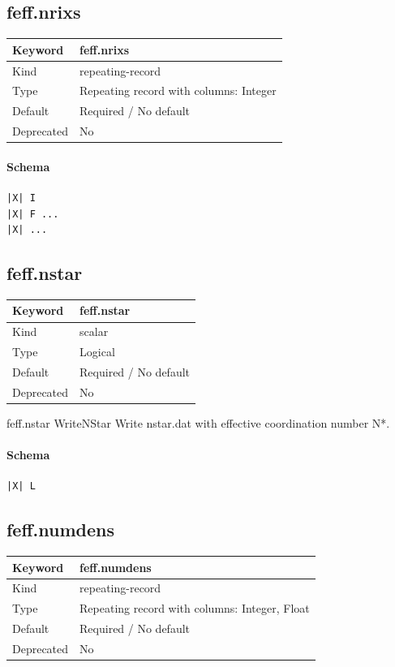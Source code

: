 \documentclass[11pt]{article}
\begin{document}
{{{{\subsection{feff.nrixs}
\label{kw:feff-nrixs}
\begin{longtable}{|p{1.5in}|p{4.5in}|}
\hline
Keyword & feff.nrixs \\
\hline
Kind & repeating-record \\
\hline
Type & Repeating record with columns: Integer \\
\hline
Default & Required / No default \\
\hline
Deprecated & No \\
\hline
\end{longtable}
\paragraph{Schema}
\begin{Verbatim}
|X| I
|X| F ...
|X| ...
\end{Verbatim}

\subsection{feff.nstar}
\label{kw:feff-nstar}
\begin{longtable}{|p{1.5in}|p{4.5in}|}
\hline
Keyword & feff.nstar \\
\hline
Kind & scalar \\
\hline
Type & Logical \\
\hline
Default & Required / No default \\
\hline
Deprecated & No \\
\hline
\end{longtable}
 feff.nstar{ WriteNStar }
 Write nstar.dat with effective coordination number N*.

\paragraph{Schema}
\begin{Verbatim}
|X| L
\end{Verbatim}

\subsection{feff.numdens}
\label{kw:feff-numdens}
\begin{longtable}{|p{1.5in}|p{4.5in}|}
\hline
Keyword & feff.numdens \\
\hline
Kind & repeating-record \\
\hline
Type & Repeating record with columns: Integer, Float \\
\hline
Default & Required / No default \\
\hline
Deprecated & No \\
\hline
\end{longtable}
}}}}
\end{document}
